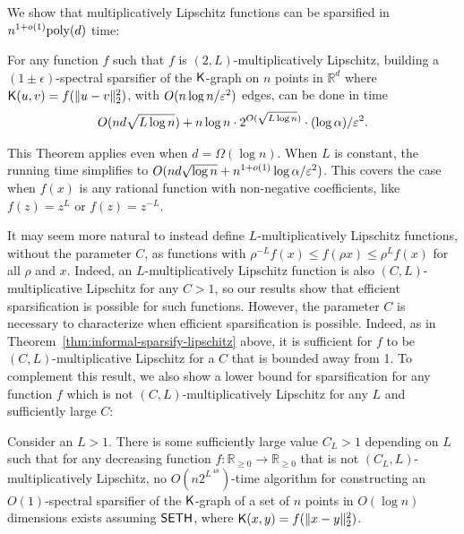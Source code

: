 We show that multiplicatively Lipschitz functions can be sparsified in $n^{1+o(1)} \mathrm{poly}(d)$ time: 

\begin{theorem}\label{thm:informal-sparsify-lipschitz}
For any function $f$ such that $f$ is $(2, L)$-multiplicatively Lipschitz, building a $(1\pm\epsilon)$-spectral sparsifier of the $\mathsf{K}$-graph on $n$ points in $\mathbb{R}^d$ where $\mathsf{K}(u,v) = f(\|u - v\|_2^2)$, with $O(n \log n / \varepsilon^2)$ edges, can be done in time
\begin{align*}
 O(nd \sqrt{L \log n}) + n \log n \cdot 2^{O(\sqrt{L \log n})} \cdot (\log\alpha)/\varepsilon^2 .
\end{align*}
\end{theorem}
This Theorem applies even when $d = \Omega(\log n)$. When $L$ is constant, the running time simplifies to $O(nd \sqrt{ \log n} + n^{1+o(1)} \log \alpha/ \varepsilon^2)$. This covers the case when $f(x)$ is any rational function with non-negative coefficients, like $f(z) = z^L$ or $f(z) = z^{-L}$. 

It may seem more natural to instead define $L$-multiplicatively Lipschitz functions, without the parameter $C$, as functions with $\rho^{-L} f(x)\le f(\rho x)\le \rho^L f(x)$ 
for all $\rho$ and $x$. Indeed, an $L$-multiplicatively Lipschitz function is also $(C,L)$-multiplicative Lipschitz for any $C>1$, so our results show that efficient sparsification is possible for such functions. However, the parameter $C$ is necessary to characterize when efficient sparsification is possible. Indeed, as in Theorem~\ref{thm:informal-sparsify-lipschitz} above, it is sufficient for $f$ to be $(C,L)$-multiplicative Lipschitz for a $C$ that is bounded away from 1. To complement this result, we also show a lower bound for sparsification for any function $f$ which is not $(C,L)$-multiplicatively Lipschitz for any $L$ and sufficiently large $C$:


\begin{theorem}\label{thm:informal-high-spars-hard}
Consider an $L > 1$. There is some sufficiently large value $C_L > 1$ depending on $L$ such that for any decreasing function $f:\mathbb{R}_{\ge 0}\rightarrow \mathbb{R}_{\ge 0}$ that is not $(C_L,L)$-multiplicatively Lipschitz, no $O(n2^{L^{.48}})$-time algorithm for constructing an $O(1)$-spectral sparsifier of the $\mathsf{K}$-graph of a set of $n$ points in $O(\log n)$ dimensions exists assuming $\mathsf{SETH}$, where $\mathsf{K}(x,y) = f(\|x-y\|_2^2)$.
\end{theorem}

